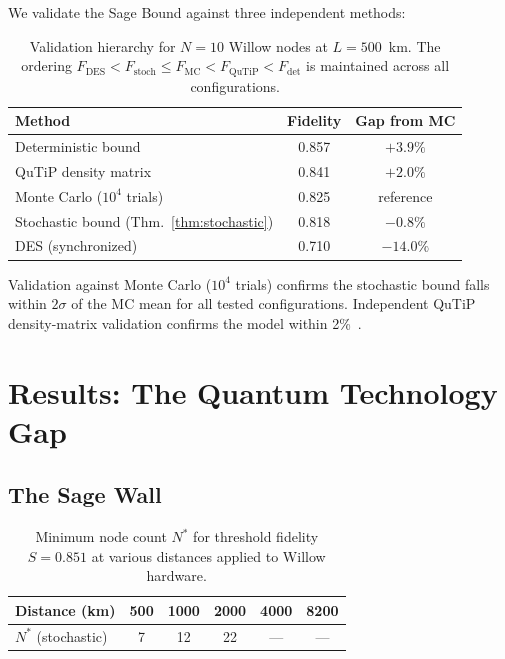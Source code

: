 \documentclass[aps,pra,reprint,amsmath,amssymb,superscriptaddress]{revtex4-2}
\begin{document}
We validate the Sage Bound against three independent methods:

\begin{table}[h]
\caption{Validation hierarchy for $N=10$ Willow nodes at $L=500$~km. The ordering $F_{\text{DES}} < F_{\text{stoch}} \leq F_{\text{MC}} < F_{\text{QuTiP}} < F_{\text{det}}$ is maintained across all configurations.}
\label{tab:validation}
\begin{ruledtabular}
\begin{tabular}{lcc}
Method & Fidelity & Gap from MC \\
\hline
Deterministic bound & 0.857 & $+3.9\%$ \\
QuTiP density matrix & 0.841 & $+2.0\%$ \\
Monte Carlo ($10^4$ trials) & 0.825 & reference \\
Stochastic bound (Thm.~\ref{thm:stochastic}) & 0.818 & $-0.8\%$ \\
DES (synchronized) & 0.710 & $-14.0\%$ \\
\end{tabular}
\end{ruledtabular}
\end{table}

Validation against Monte Carlo ($10^4$ trials) confirms the stochastic bound falls within $2\sigma$ of the MC mean for all tested configurations. Independent QuTiP density-matrix validation confirms the model within 2\%~\cite{qutip}.


\section{Results: The Quantum Technology Gap}

\subsection{The Sage Wall}

\begin{table}[h]
\caption{Minimum node count $N^*$ for threshold fidelity $S = 0.851$ at various distances applied to Willow hardware.}
\label{tab:optimal}
\begin{ruledtabular}
\begin{tabular}{lccccc}
Distance (km) & 500 & 1000 & 2000 & 4000 & 8200 \\
\hline
$N^*$ (stochastic) & 7 & 12 & 22 & --- & --- \\
\end{tabular}
\end{ruledtabular}
\end{table}
\end{document}
